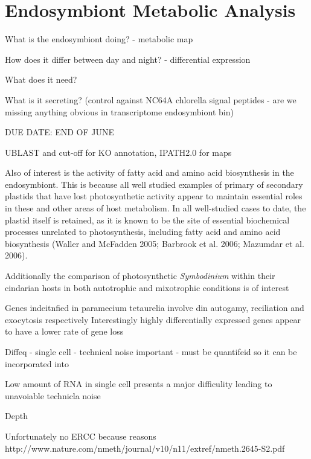 \graphicspath{{chapters/6.Chapter_4/figures}}

\chapter{Endosymbiont Metabolic Analysis}

What is the endosymbiont doing? - metabolic map

How does it differ between day and night? - differential expression

What does it need?

What is it secreting? (control against NC64A chlorella signal peptides - are we missing anything obvious in transcriptome endosymbiont bin)

DUE DATE: END OF JUNE


UBLAST and cut-off for KO annotation, IPATH2.0 for maps  \citep{Wisecaver2014}




Also of interest is the activity of fatty acid and amino acid biosynthesis in the endosymbiont.  This is because
all well studied examples of primary of secondary plastids that have lost photosynthetic activity appear to maintain 
essential roles in these and other areas of host metabolism.
In all well-studied cases to date, the plastid itself is retained, as it is known to be the site of essential biochemical processes unrelated to photosynthesis, including fatty acid and amino acid biosynthesis (Waller and McFadden 2005; Barbrook et al. 2006; Mazumdar et al. 2006). \citep{Donaher2009}



Additionally the comparison of photosynthetic \textit{Symbodinium} within their cindarian hosts in both autotrophic and mixotrophic conditions
is of interest \citep{Xiang2015}


Genes indeitnfied in paramecium tetaurelia involve din autogamy, reciliation and exocytosis respectively \citep{Arnaiz2010}
Interestingly highly differentially expressed genes appear to have a lower rate of gene loss \citep{Arnaiz2010}




Diffeq - single cell - technical noise important - must be quantifeid so it can be incorporated into 

Low amount of RNA in single cell presents a major difficulity leading to unavoiable technicla noise \citep{Brennecke2013}

Depth


Unfortunately no ERCC because reasons
http://www.nature.com/nmeth/journal/v10/n11/extref/nmeth.2645-S2.pdf

